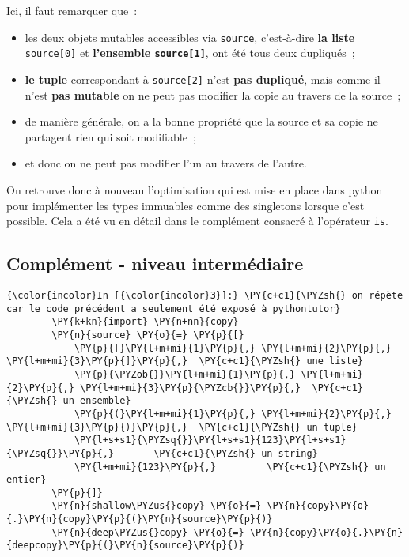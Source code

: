     Ici, il faut remarquer que~:

\begin{itemize}
\tightlist
\item
  les deux objets mutables accessibles via \texttt{source}, c'est-à-dire
  \textbf{la liste} \texttt{source{[}0{]}} et \textbf{l'ensemble
  \texttt{source{[}1{]}}}, ont été tous deux dupliqués~;
\item
  \textbf{le tuple} correspondant à \texttt{source{[}2{]}} n'est
  \textbf{pas dupliqué}, mais comme il n'est \textbf{pas mutable} on ne
  peut pas modifier la copie au travers de la source~;
\item
  de manière générale, on a la bonne propriété que la source et sa copie
  ne partagent rien qui soit modifiable~;
\item
  et donc on ne peut pas modifier l'un au travers de l'autre.
\end{itemize}

On retrouve donc à nouveau l'optimisation qui est mise en place dans
python pour implémenter les types immuables comme des singletons lorsque
c'est possible. Cela a été vu en détail dans le complément consacré à
l'opérateur \texttt{is}.

    \hypertarget{compluxe9ment---niveau-intermuxe9diaire}{%
\subsection{Complément - niveau
intermédiaire}\label{compluxe9ment---niveau-intermuxe9diaire}}

    \begin{Verbatim}[commandchars=\\\{\},frame=single,framerule=0.3mm,rulecolor=\color{cellframecolor}]
{\color{incolor}In [{\color{incolor}3}]:} \PY{c+c1}{\PYZsh{} on répète car le code précédent a seulement été exposé à pythontutor}
        \PY{k+kn}{import} \PY{n+nn}{copy}
        \PY{n}{source} \PY{o}{=} \PY{p}{[}
            \PY{p}{[}\PY{l+m+mi}{1}\PY{p}{,} \PY{l+m+mi}{2}\PY{p}{,} \PY{l+m+mi}{3}\PY{p}{]}\PY{p}{,}  \PY{c+c1}{\PYZsh{} une liste}
            \PY{p}{\PYZob{}}\PY{l+m+mi}{1}\PY{p}{,} \PY{l+m+mi}{2}\PY{p}{,} \PY{l+m+mi}{3}\PY{p}{\PYZcb{}}\PY{p}{,}  \PY{c+c1}{\PYZsh{} un ensemble}
            \PY{p}{(}\PY{l+m+mi}{1}\PY{p}{,} \PY{l+m+mi}{2}\PY{p}{,} \PY{l+m+mi}{3}\PY{p}{)}\PY{p}{,}  \PY{c+c1}{\PYZsh{} un tuple}
            \PY{l+s+s1}{\PYZsq{}}\PY{l+s+s1}{123}\PY{l+s+s1}{\PYZsq{}}\PY{p}{,}       \PY{c+c1}{\PYZsh{} un string}
            \PY{l+m+mi}{123}\PY{p}{,}         \PY{c+c1}{\PYZsh{} un entier}
        \PY{p}{]}
        \PY{n}{shallow\PYZus{}copy} \PY{o}{=} \PY{n}{copy}\PY{o}{.}\PY{n}{copy}\PY{p}{(}\PY{n}{source}\PY{p}{)}
        \PY{n}{deep\PYZus{}copy} \PY{o}{=} \PY{n}{copy}\PY{o}{.}\PY{n}{deepcopy}\PY{p}{(}\PY{n}{source}\PY{p}{)}
\end{Verbatim}


